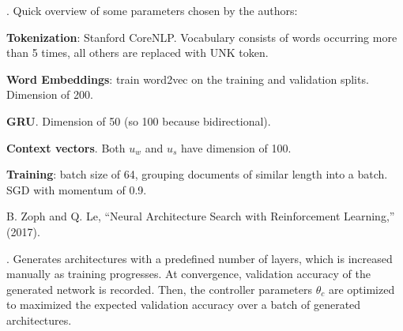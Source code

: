 \documentclass[11pt]{article}
\begin{document}
\myspace
\p {}. Quick overview of some parameters chosen by the authors:
\begin{compactitem}
	\item \textbf{Tokenization}: Stanford CoreNLP. Vocabulary consists of words occurring more than 5 times, all others are replaced with UNK token.
	
	\item \textbf{Word Embeddings}: train word2vec on the training and validation splits. Dimension of 200.
	
	\item \textbf{GRU}. Dimension of 50 (so 100 because bidirectional). 
	
	\item \textbf{Context vectors}. Both $u_w$ and $u_s$ have dimension of 100. 
	
	\item \textbf{Training}: batch size of 64, grouping documents of similar length into a batch. SGD with momentum of 0.9.
\end{compactitem}






\vspace{-1em}
{\footnotesize B. Zoph and Q. Le, ``Neural Architecture Search with Reinforcement Learning,'' (2017).}


\p {}. Generates architectures with a predefined number of layers, which is increased manually as training progresses. At convergence, validation accuracy of the generated network is recorded. Then, the controller parameters $\theta_c$ are optimized to maximized the expected validation accuracy over a batch of generated architectures. 
\end{document}
